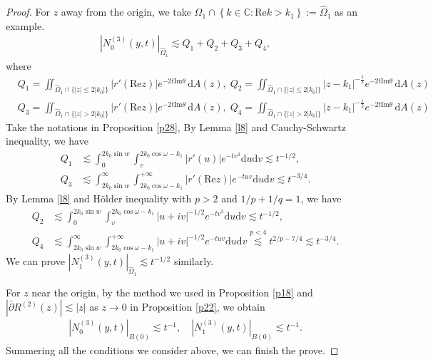 \documentclass[11pt]{article}
\numberwithin{equation}{section}
\begin{document}
\begin{proof}
    For $z$ away from the origin, we take $\Omega_1\cap\left\{k\in\mathbb{C}:\mathrm{Re}k>k_1\right\}:=\widehat\Omega_1$ as an example.
    \begin{align*}
    |N^{(3)}_0(y,t)|_{\widehat\Omega_1}\lesssim Q_1+Q_2+Q_3+Q_4,
    \end{align*}
    where
    \begin{align*}
        & Q_1=\iint_{\widehat\Omega_1\cap\{|z|\leqslant2|k_0|\}} |r'(\mathrm{Re}z)| e^{-2t \mathrm{Im} \theta}\,\mathrm{d}A(z),\;Q_2=\iint_{\widehat\Omega_1\cap\{|z|\leqslant2|k_0|\}}|z - k_1|^{-\frac{1}{2}} e^{-2t \mathrm{Im} \theta} \, \mathrm{d}A(z)\\
   & Q_3=\iint_{\widehat\Omega_1\cap\{|z|>2|k_0|\}} |r'(\mathrm{Re}z)| e^{-2t \mathrm{Im} \theta}\,\mathrm{d}A(z),\;Q_4=\iint_{\widehat\Omega_1\cap\{|z|>2|k_0|\}}|z - k_1|^{-\frac{1}{2}} e^{-2t \mathrm{Im} \theta} \, \mathrm{d}A(z)
    \end{align*}
    Take the notations in Proposition \ref{p28}, By Lemma \ref{l8} and Cauchy-Schwartz inequality, we have
\begin{align*}
		Q_1 & \lesssim \int_{0}^{2k_0 \sin w} \int_{v}^{2k_0\cos\omega-k_1} \left|r'(u) \right|e^{-tv^3} \mathrm{d}u \mathrm{d}v  \lesssim t^{-1/2},\\
Q_3 & \lesssim \int_{2k_0 \sin w}^\infty \int_{2k_0\cos\omega-k_1}^{+\infty} \left|r'(\mathrm{Re}z) \right| e^{-tuv} \mathrm{d}u \mathrm{d}v  \lesssim t^{-3/4}.
	\end{align*}
By Lemma \ref{l8} and H\"{o}lder inequality with $p>2$ and $1/p+1/q=1$, we have
	\begin{align*}
		Q_2 &\lesssim \int_{0}^{2k_0 \sin w} \int_{v}^{2k_0\cos\omega-k_1}   \left| u + i v\right|^{-1/2} e^{-tv^3} \mathrm{d}u  \mathrm{d}v \lesssim t^{-1/2},\\
Q_4 &\lesssim \int_{2k_0 \sin w}^\infty \int_{2k_0\cos\omega-k_1}^{+\infty}  \left| u + i v\right|^{-1/2}e^{-tuv} \mathrm{d}u  \mathrm{d}v \overset{p<4}\lesssim t^{2/p-7/4}\lesssim t^{-3/4}.
	\end{align*}
   We can prove $|N^{(3)}_1(y,t)|_{\widehat\Omega_1}\lesssim t^{-1/2}$ similarly.

   For $z$ near the origin, by the method we used in Proposition \ref{p18} and $|\bar\partial R^{(2)}(z)|\lesssim|z|$ as $z\to 0$ in Proposition \ref{p22}, we obtain
   \begin{align}
       |N^{(3)}_0(y, t) |_{B(0)}\lesssim t^{-1},\quad |N^{(3)}_1(y, t) |_{B(0)}\lesssim t^{-1}.
   \end{align}
   Summering all the conditions we consider above, we can finish the prove.
\end{proof}
\end{document}
